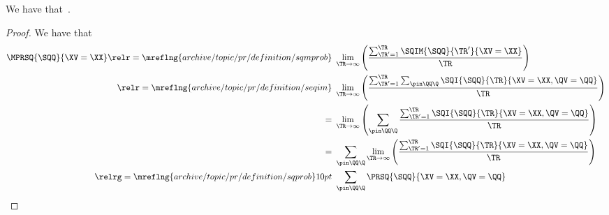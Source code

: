 \begin{proposition}
  We have that\ \mprsqexprprop.%
\end{proposition}

\begin{proof}
  We have that
  \begin{align*}
  \MPRSQ{\SQQ}{\XV = \XX}
                    \relr = {\mreflng{archive/topic/pr/definition/sqmprob}} \ & 
                    \lim_{\TR \rightarrow \infty}\left(\frac{\sum_{\TR' = 1}^{\TR}\SQIM{\SQQ}{\TR'}{\XV = \XX}}{\TR}\right)\\
                    \relr = {\mreflng{archive/topic/pr/definition/seqim}} \ & 
                    \lim_{\TR \rightarrow \infty}\left(\frac{\sum_{\TR' = 1}^{\TR}\sum_{\pin\QQ\Q} \SQI{\SQQ}{\TR}{\XV = \XX, \QV = \QQ}}{\TR}\right)\\
                    = \ & 
                    \lim_{\TR \rightarrow \infty}\left(\sum_{\pin\QQ\Q} \frac{\sum_{\TR' = 1}^{\TR}\SQI{\SQQ}{\TR}{\XV = \XX, \QV = \QQ}}{\TR}\right)\\
                    = \ & 
                    \sum_{\pin\QQ\Q} \lim_{\TR \rightarrow \infty}\left(\frac{\sum_{\TR' = 1}^{\TR}\SQI{\SQQ}{\TR}{\XV = \XX, \QV = \QQ}}{\TR}\right)\\
                    \relrg = {\mreflng{archive/topic/pr/definition/sqprob}} 10pt \ & 
                    \sum_{\pin\QQ\Q}\PRSQ{\SQQ}{\XV = \XX, \QV = \QQ}
  \end{align*}
\end{proof}
